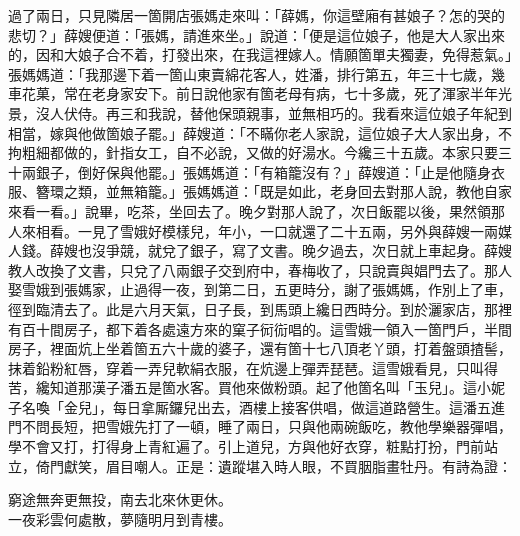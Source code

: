 過了兩日，只見隣居一箇開店張媽走來叫：「薛媽，你這壁廂有甚娘子？怎的哭的悲切？」薛嫂便道：「張媽，請進來坐。」說道：「便是這位娘子，他是大人家出來的，因和大娘子合不着，打發出來，在我這裡嫁人。情願箇單夫獨妻，免得惹氣。」張媽媽道：「我那邊下着一箇山東賣綿花客人，姓潘，排行第五，年三十七歲，幾車花菓，常在老身家安下。前日說他家有箇老母有病，七十多歲，死了渾家半年光景，沒人伏侍。再三和我說，替他保頭親事，並無相巧的。我看來這位娘子年紀到相當，嫁與他做箇娘子罷。」薛嫂道：「不瞞你老人家說，這位娘子大人家出身，不拘粗細都做的，針指女工，自不必說，又做的好湯水。今纔三十五歲。本家只要三十兩銀子，倒好保與他罷。」張媽媽道：「有箱籠沒有？」薛嫂道：「止是他隨身衣服、簪環之類，並無箱籠。」張媽媽道：「既是如此，老身回去對那人說，教他自家來看一看。」說畢，吃茶，坐回去了。晚夕對那人說了，次日飯罷以後，果然領那人來相看。一見了雪娥好模樣兒，年小，一口就還了二十五兩，另外與薛嫂一兩媒人錢。薛嫂也沒爭競，就兌了銀子，寫了文書。晚夕過去，次日就上車起身。薛嫂教人改換了文書，只兌了八兩銀子交到府中，春梅收了，只說賣與娼門去了。{}那人娶雪娥到張媽家，止過得一夜，到第二日，五更時分，謝了張媽媽，作別上了車，徑到臨清去了。此是六月天氣，日子長，到馬頭上纔日西時分。到於灑家店，那裡有百十間房子，都下着各處遠方來的窠子衏䘕唱的。這雪娥一領入一箇門戶，半間房子，裡面炕上坐着箇五六十歲的婆子，還有箇十七八頂老丫頭，打着盤頭揸髻，抹着鉛粉紅唇，穿着一弄兒軟絹衣服，在炕邊上彈弄琵琶。這雪娥看見，只叫得苦，纔知道那漢子潘五是箇水客。買他來做粉頭。起了他箇名叫「玉兒」。這小妮子名喚「金兒」，每日拿厮鑼兒出去，酒樓上接客供唱，做這道路營生。這潘五進門不問長短，把雪娥先打了一頓，睡了兩日，只與他兩碗飯吃，{}教他學樂器彈唱，學不會又打，打得身上青紅遍了。引上道兒，方與他好衣穿，粧點打扮，門前站立，倚門獻笑，眉目嘲人。正是：遺蹤堪入時人眼，不買胭脂畫牡丹。有詩為證：

\begin{myquote}
窮途無奔更無投，南去北來休更休。\\一夜彩雲何處散，夢隨明月到青樓。
\end{myquote}

